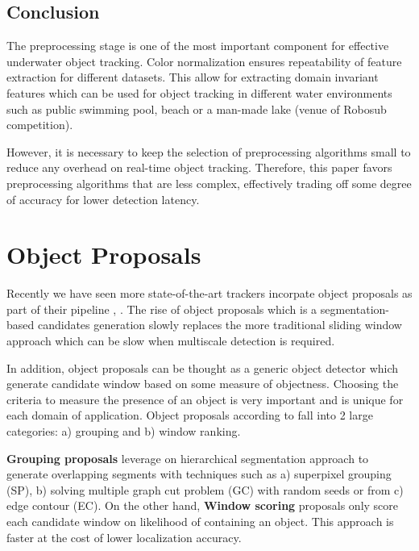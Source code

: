 \documentclass[hyp]{socreport}
\begin{document}
\section{Conclusion}

The preprocessing stage is one of the most important component for effective
underwater object tracking. Color normalization ensures repeatability of feature
extraction for different datasets. This allow for extracting domain invariant
features which can be used for object tracking in different water environments
such as public swimming pool, beach or a man-made lake (venue of Robosub competition).

However, it is necessary to keep the selection of preprocessing algorithms small
to reduce any overhead on real-time object tracking. Therefore, this paper
favors preprocessing algorithms that are less complex, effectively trading off
some degree of accuracy for lower detection latency.


\chapter{Object Proposals}

Recently we have seen more state-of-the-art trackers incorpate object proposals
as part of their pipeline , .
The rise of object proposals which is a segmentation-based candidates generation
slowly replaces the more traditional sliding window approach which can be slow
when multiscale detection is required.

In addition, object proposals can be thought as a generic object detector which
generate candidate window based on some measure of objectness. Choosing the
criteria to measure the presence of an object is very important and is unique
for each domain of application. Object proposals according to
 fall into 2 large categories: a) grouping and b)
window ranking. 

\textbf{Grouping proposals} leverage on hierarchical segmentation approach to
generate overlapping segments with techniques such as a) superpixel grouping
(SP), b) solving multiple graph cut problem (GC) with random seeds or from c)
edge contour (EC). On the other hand, \textbf{Window scoring} proposals only
score each candidate window on likelihood of containing an object. This approach
is faster at the cost of lower localization accuracy.
\end{document}
